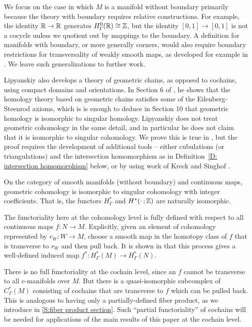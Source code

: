 We focus on the case in which $M$ is a manifold without boundary primarily because
the theory with boundary requires relative constructions.
For example, the identity $\mathbb{R}\to\mathbb{R}$ generates $H_\Gamma^0(\mathbb{R})\cong \mathbb{Z}$, but the identity $[0,1] \to [0,1]$ is not a cocycle unless we quotient out by mappings to the boundary.
A definition for manifolds with boundary, or more generally corners, would also require boundary restrictions for transversality of weakly smooth maps, as developed for example in \cite{Joy12}.
We leave such generalizations to further work.

Lipyanskiy also develops a theory of geometric chains, as opposed to cochains, using compact domains and orientations.
In Section 6 of \cite{Lipy14}, he shows that the homology theory based on geometric chains satisfies some of the Eilenberg-Steenrod axioms, which is is enough to deduce in Section 10 that geometric homology is isomorphic to singular homology.
Lipyanskiy does not treat geometric cohomology in the same detail, and in particular he does not claim that it is isomorphic to singular cohomology.
We prove this is true in \cite{medina2022foundations}, but the proof requires the development of additional tools -- either cubulations (or triangulations) and the
intersection homomorphism as in Definition~\ref{D: intersection homomorphism} below, or by using work of Kreck and Singhof \cite{Krec10, Krec10b}.

\begin{theorem}\label{T: geometric singular isomorphism}
	On the category of smooth manifolds (without boundary) and continuous maps, geometric cohomology is isomorphic to singular cohomology with integer coefficients.
	That is, the functors $H^*_\Gamma$ and $H^*(\cdot \,;\mathbb{Z})$ are naturally isomorphic.
\end{theorem}

The functoriality here at the cohomology level is fully defined with respect to all continuous maps $f \colon N \to M$.
Explicitly, given an element of cohomology represented by $r_W \colon W \to M$, choose a smooth map in the homotopy class of $f$ that is transverse to $r_W$ and then pull back.
It is shown in \cite{medina2022foundations} that this process gives a well-defined induced map $f^* \colon H^*_\Gamma(M) \to H^*_\Gamma(N)$.

There is no full functoriality at the cochain level, since an $f$ cannot be transverse to all c-manifolds over $M$.
But there is a quasi-isomorphic subcomplex of $C_\Gamma^*(M)$ consisting of cochains that are transverse to $f$ which can be pulled back.
This is analogous to having only a partially-defined fiber product, as we introduce in \cref{S:fiber product section}.
Such ``partial functoriality'' of cochains will be needed for applications of the main results of this paper at the cochain level.

